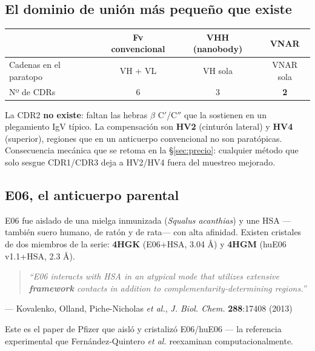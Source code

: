\documentclass[11pt]{article}
\begin{document}
\subsection{El dominio de unión más pequeño que existe}
\begin{center}
\begin{tabular}{lccc}
\toprule
 & Fv convencional & VHH (nanobody) & VNAR \\
\midrule
Cadenas en el paratopo & VH + VL & VH sola & VNAR sola \\
Nº de CDRs & 6 & 3 & \textbf{2} \\
\bottomrule
\end{tabular}
\end{center}
La CDR2 \textbf{no existe}: faltan las hebras $\beta$ C$'$/C$''$ que la sostienen en un plegamiento IgV típico. La compensación son \textbf{HV2} (cinturón lateral) y \textbf{HV4} (superior), regiones que en un anticuerpo convencional no son paratópicas. Consecuencia mecánica que se retoma en la \S\ref{sec:precio}: cualquier método que solo sesgue CDR1/CDR3 deja a HV2/HV4 fuera del muestreo mejorado.

\subsection{E06, el anticuerpo parental}
E06 fue aislado de una mielga inmunizada (\textit{Squalus acanthias}) y une HSA —también suero humano, de ratón y de rata— con alta afinidad. Existen cristales de dos miembros de la serie: \textbf{4HGK} (E06+HSA, 3.04 \r{A}) y \textbf{4HGM} (huE06 v1.1+HSA, 2.3 \r{A}).
\begin{quote}
\itshape ``E06 interacts with HSA in an atypical mode that utilizes extensive \textbf{framework} contacts in addition to complementarity-determining regions.''
\end{quote}
\begin{flushright}\small --- Kovalenko, Olland, Piche-Nicholas \textit{et al.}, \textit{J. Biol. Chem.} \textbf{288}:17408 (2013)\end{flushright}
Este es el paper de Pfizer que aisló y cristalizó E06/huE06 --- la referencia experimental que Fernández-Quintero \textit{et al.} reexaminan computacionalmente.
\end{document}

